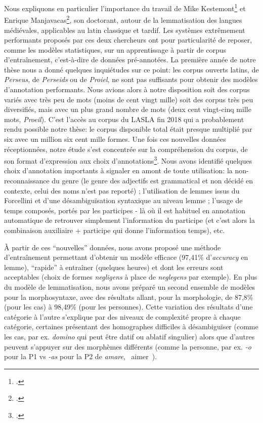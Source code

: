 Nous expliquons en particulier l'importance du travail de Mike Kestemont\footcite{kestemont_lemmatization_2017} et Enrique Manjavacas\footcite{manjavacas_improving_2019}, son doctorant, autour de la lemmatisation des langues médiévales, applicables au latin classique et tardif. Les systèmes extrêmement performants proposés par ces deux chercheurs ont pour particularité de reposer, comme les modèles statistiques, sur un apprentissage à partir de corpus d'entraînement, c'est-à-dire de données pré-annotées. La première année de notre thèse nous a donné quelques inquiétudes sur ce point: les corpus ouverts latins, de \textit{Perseus}, de \textit{Perseids} ou de \textit{Proiel}, ne sont pas suffisants pour obtenir des modèles d'annotation performants. Nous avions alors à notre disposition soit des corpus variés avec très peu de mots (moins de cent vingt mille) soit des corpus très peu diversifiés, mais avec un plus grand nombre de mots (deux cent vingt-cinq mille mots, \textit{Proeil}). C'est l'accès au corpus du LASLA fin 2018 qui a probablement rendu possible notre thèse: le corpus disponible total était presque multiplié par six avec un million six cent mille formes. Une fois ces nouvelles données réceptionnées, notre étude s'est concentrée sur la compréhension du corpus, de son format d'expression aux choix d'annotations\footcite{BodsonCodification1966}. Nous avons identifié quelques choix d'annotation importants à signaler en amont de toute utilisation: la non-reconnaissance du genre (le genre des adjectifs est grammatical et non décidé en contexte, celui des noms n'est pas reporté) ; l'utilisation de lemmes issus du Forcellini et d'une désambiguïsation syntaxique au niveau lemme ; l'usage de temps composés, portés par les participes - là où il est habituel en annotation automatique de retrouver simplement l'information du participe (et c'est alors la combinaison auxiliaire + participe qui donne l'information temps), etc.

À partir de ces \enquote{nouvelles} données, nous avons proposé une méthode d'entraînement permettant d'obtenir un modèle efficace (97,41\% d'\textit{accuracy} en lemme), \enquote{rapide} à entraîner (quelques heures) et dont les erreurs sont acceptables (choix de formes \textit{negligens} à place de \textit{neglegens} par exemple). En plus du modèle de lemmatisation, nous avons préparé un second ensemble de modèles pour la morphosyntaxe, avec des résultats allant, pour la morphologie, de 87,8\% (pour les cas) à 98,49\% (pour les personnes). Cette variation des résultats d'une catégorie à l'autre s'explique par des niveaux de complexité propre à chaque catégorie, certaines présentant des homographes difficiles à désambiguïser (comme les cas, par ex. \textit{domino} qui peut être datif ou ablatif singulier) alors que d'autres peuvent s'appuyer sur des morphèmes différents (comme la personne, par ex. \textit{-o} pour la P1 vs \textit{-as} pour la P2 de \textit{amare}, \og~aimer~\fg{}).

